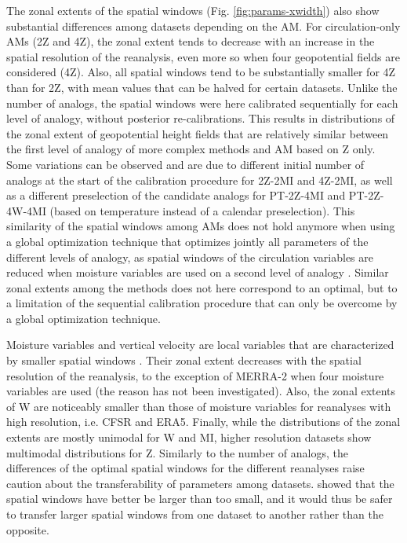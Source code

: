 \documentclass[alpha-refs]{wiley-article}
\begin{document}
The zonal extents of the spatial windows (Fig. \ref{fig:params-xwidth}) also show substantial differences among datasets depending on the AM. For circulation-only AMs (2Z and 4Z), the zonal extent tends to decrease with an increase in the spatial resolution of the reanalysis, even more so when four geopotential fields are considered (4Z). Also, all spatial windows tend to be substantially smaller for 4Z than for 2Z, with mean values that can be halved for certain datasets. Unlike the number of analogs, the spatial windows were here calibrated sequentially for each level of analogy, without posterior re-calibrations. This results in distributions of the zonal extent of geopotential height fields that are relatively similar between the first level of analogy of more complex methods and AM based on Z only. Some variations can be observed and are due to different initial number of analogs at the start of the calibration procedure for 2Z-2MI and 4Z-2MI, as well as a different preselection of the candidate analogs for PT-2Z-4MI and PT-2Z-4W-4MI (based on temperature instead of a calendar preselection). This similarity of the spatial windows among AMs does not hold anymore when using a global optimization technique that optimizes jointly all parameters of the different levels of analogy, as spatial windows of the circulation variables are reduced when moisture variables are used on a second level of analogy \citep{Horton2018a}. Similar zonal extents among the methods does not here correspond to an optimal, but to a limitation of the sequential calibration procedure that can only be overcome by a global optimization technique.

Moisture variables and vertical velocity are local variables that are characterized by smaller spatial windows \citep{BenDaoud2016, Horton2018a}. Their zonal extent decreases with the spatial resolution of the reanalysis, to the exception of MERRA-2 when four moisture variables are used (the reason has not been investigated). Also, the zonal extents of W are noticeably smaller than those of moisture variables for reanalyses with high resolution, i.e. CFSR and ERA5. Finally, while the distributions of the zonal extents are mostly unimodal for W and MI, higher resolution datasets show multimodal distributions for Z. Similarly to the number of analogs, the differences of the optimal spatial windows for the different reanalyses raise caution about the transferability of parameters among datasets. \citet{Horton2019} showed that the spatial windows have better be larger than too small, and it would thus be safer to transfer larger spatial windows from one dataset to another rather than the opposite. 
\end{document}
